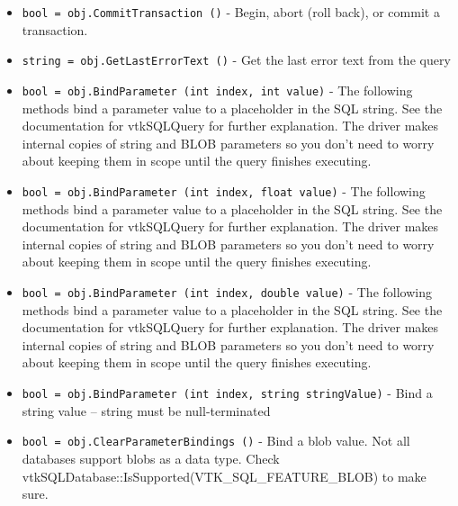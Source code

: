 \begin{itemize}
\item  \verb|bool = obj.CommitTransaction ()| -  Begin, abort (roll back), or commit a transaction.

\item  \verb|string = obj.GetLastErrorText ()| -  Get the last error text from the query

\item  \verb|bool = obj.BindParameter (int index, int value)| -  The following methods bind a parameter value to a placeholder in
 the SQL string.  See the documentation for vtkSQLQuery for
 further explanation.  The driver makes internal copies of string
 and BLOB parameters so you don't need to worry about keeping them
 in scope until the query finishes executing.

\item  \verb|bool = obj.BindParameter (int index, float value)| -  The following methods bind a parameter value to a placeholder in
 the SQL string.  See the documentation for vtkSQLQuery for
 further explanation.  The driver makes internal copies of string
 and BLOB parameters so you don't need to worry about keeping them
 in scope until the query finishes executing.

\item  \verb|bool = obj.BindParameter (int index, double value)| -  The following methods bind a parameter value to a placeholder in
 the SQL string.  See the documentation for vtkSQLQuery for
 further explanation.  The driver makes internal copies of string
 and BLOB parameters so you don't need to worry about keeping them
 in scope until the query finishes executing.

\item  \verb|bool = obj.BindParameter (int index, string stringValue)| -  Bind a string value -- string must be null-terminated

\item  \verb|bool = obj.ClearParameterBindings ()| -  Bind a blob value.  Not all databases support blobs as a data
 type.  Check vtkSQLDatabase::IsSupported(VTK\_SQL\_FEATURE\_BLOB) to
 make sure.

\end{itemize}
